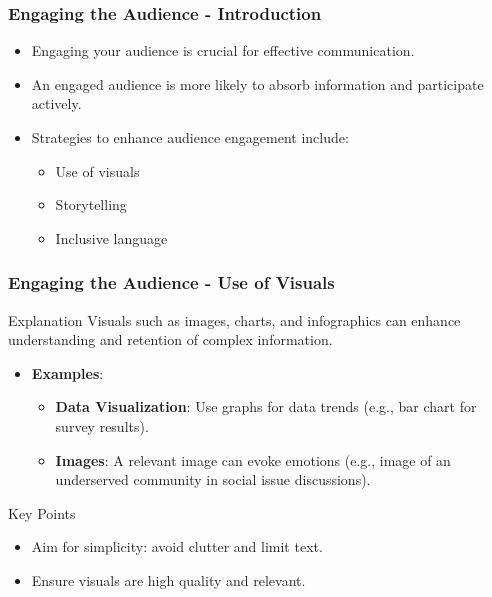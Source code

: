 \documentclass[aspectratio=169]{beamer}
\begin{document}
\begin{frame}[fragile]
  \frametitle{Engaging the Audience - Introduction}
  \begin{itemize}
      \item Engaging your audience is crucial for effective communication.
      \item An engaged audience is more likely to absorb information and participate actively.
      \item Strategies to enhance audience engagement include:
      \begin{itemize}
          \item Use of visuals
          \item Storytelling
          \item Inclusive language
      \end{itemize}
  \end{itemize}
\end{frame}

\begin{frame}[fragile]
  \frametitle{Engaging the Audience - Use of Visuals}
  \begin{block}{Explanation}
      Visuals such as images, charts, and infographics can enhance understanding and retention of complex information.
  \end{block}
  
  \begin{itemize}
      \item \textbf{Examples}:
      \begin{itemize}
          \item \textbf{Data Visualization}: Use graphs for data trends (e.g., bar chart for survey results).
          \item \textbf{Images}: A relevant image can evoke emotions (e.g., image of an underserved community in social issue discussions).
      \end{itemize}
  \end{itemize}

  \begin{block}{Key Points}
      \begin{itemize}
          \item Aim for simplicity: avoid clutter and limit text.
          \item Ensure visuals are high quality and relevant.
      \end{itemize}
  \end{block}
\end{frame}
\end{document}

